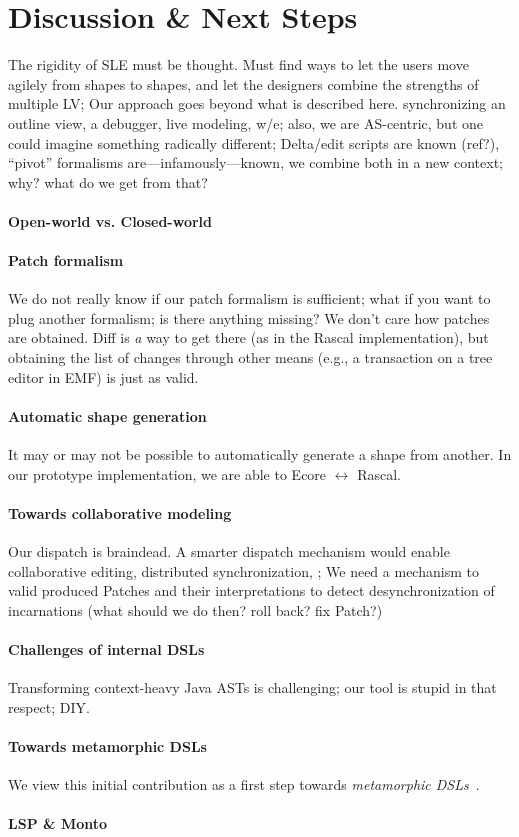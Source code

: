 \section{Discussion \& Next Steps}
\label{sec:discussion}
The rigidity of SLE must be thought. Must find ways to let the users move agilely from shapes to shapes, and let the designers combine the strengths of multiple LV;
Our approach goes beyond what is described here. \eg synchronizing an outline view, a debugger, live modeling, w/e; also, we are AS-centric, but one could imagine something radically different;
Delta/edit scripts are known (ref?), ``pivot'' formalisms are---infamously---known, we combine both in a new context; why? what do we get from that?

\paragraph{Open-world vs. Closed-world}

\paragraph{Patch formalism}
We do not really know if our patch formalism is sufficient; what if you want to plug another formalism; is there anything missing?
We don’t care how patches are obtained. Diff is \emph{a} way to get there (as in the Rascal implementation), but obtaining the list of changes through other means (e.g., a transaction on a tree editor in EMF) is just as valid.

\paragraph{Automatic shape generation}
It may or may not be possible to automatically generate a shape from another.
In our prototype implementation, we are able to Ecore $\leftrightarrow$ Rascal.

\paragraph{Towards collaborative modeling}
Our dispatch is braindead. A smarter dispatch mechanism would enable collaborative editing, distributed synchronization, \etc;
We need a mechanism to valid produced Patches and their interpretations to detect desynchronization of incarnations (what should we do then? roll back? fix Patch?)

\paragraph{Challenges of internal DSLs}
Transforming context-heavy Java ASTs is challenging; our tool is stupid in that respect; DIY.

\paragraph{Towards metamorphic DSLs}
We view this initial contribution as a first step towards \emph{metamorphic DSLs}~\cite{acher2014metamorphic}.

\paragraph{LSP \& Monto}
